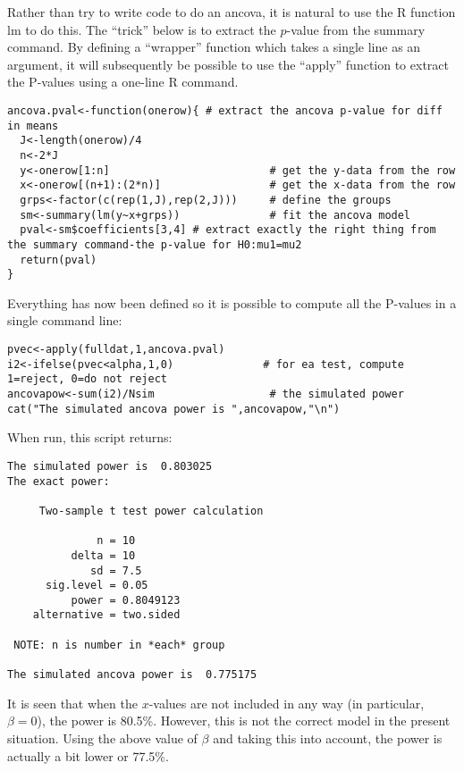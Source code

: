 \documentclass[12pt,a4paper]{article}
\theoremstyle{regla}
\theoremstyle{remark}
\theoremstyle{definition}
\theoremstyle{nonumberbreak}
\begin{document}
\begin{xmpl}
Rather than try to write code to do an ancova, it is natural to use the R function lm to do this.  The ``trick'' below is to extract the $p$-value from the summary command.  By defining a ``wrapper'' function which takes a single line as an argument, it will subsequently be possible to use the ``apply'' function to extract the P-values using a one-line R command.

\begin{lstlisting}
ancova.pval<-function(onerow){ # extract the ancova p-value for diff in means
  J<-length(onerow)/4
  n<-2*J
  y<-onerow[1:n]                         # get the y-data from the row
  x<-onerow[(n+1):(2*n)]                 # get the x-data from the row
  grps<-factor(c(rep(1,J),rep(2,J)))     # define the groups
  sm<-summary(lm(y~x+grps))              # fit the ancova model
  pval<-sm$coefficients[3,4] # extract exactly the right thing from the summary command-the p-value for H0:mu1=mu2
  return(pval)
}
\end{lstlisting}
Everything has now been defined so it is possible to compute all the P-values in a single command line:
\begin{lstlisting}
pvec<-apply(fulldat,1,ancova.pval)
i2<-ifelse(pvec<alpha,1,0)              # for ea test, compute 1=reject, 0=do not reject
ancovapow<-sum(i2)/Nsim                  # the simulated power
cat("The simulated ancova power is ",ancovapow,"\n")
\end{lstlisting}

When run, this script returns:
\begin{lstlisting}
The simulated power is  0.803025 
The exact power:

     Two-sample t test power calculation 

              n = 10
          delta = 10
             sd = 7.5
      sig.level = 0.05
          power = 0.8049123
    alternative = two.sided

 NOTE: n is number in *each* group 

The simulated ancova power is  0.775175 
\end{lstlisting}

It is seen that when the $x$-values are not included in any way (in particular, $\beta=0$), the power is 80.5\%.  However, this is not the correct model in the present situation.  Using the above value of $\beta$ and taking this into account, the power is actually a bit lower or 77.5\%.

\end{xmpl}
\end{document}
